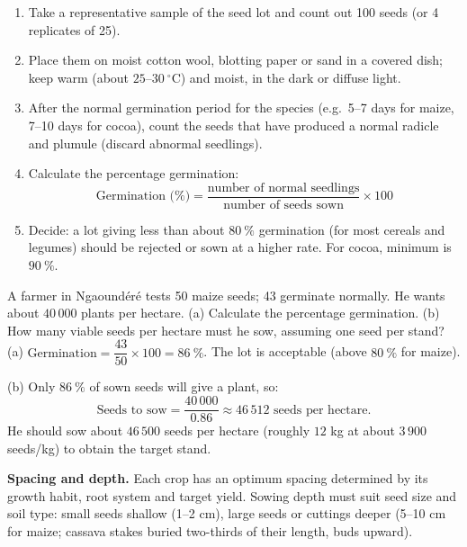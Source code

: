 \documentclass[11pt]{article}
\newcounter{popsec}
\newcounter{popsub}
\newcommand{\courssub}[1]{%
  \stepcounter{popsub}%
  \par\vspace{9pt}\noindent{\popxbold\fontsize{11.5}{13}\selectfont\color{popink}{\color{poporange}\thepopsec.\thepopsub}\hspace{6pt}#1}\par\nopagebreak\vspace{4pt}
}
\begin{document}
\begin{methode}
\begin{enumerate}
\item Take a representative sample of the seed lot and count out 100 seeds (or 4 replicates of 25).
\item Place them on moist cotton wool, blotting paper or sand in a covered dish; keep warm (about $25$--$30\ ^{\circ}\mathrm{C}$) and moist, in the dark or diffuse light.
\item After the normal germination period for the species (e.g.\ 5--7 days for maize, 7--10 days for cocoa), count the seeds that have produced a normal radicle and plumule (discard abnormal seedlings).
\item Calculate the percentage germination:
\[ \text{Germination (\%)} = \frac{\text{number of normal seedlings}}{\text{number of seeds sown}} \times 100 \]
\item Decide: a lot giving less than about $80\ \%$ germination (for most cereals and legumes) should be rejected or sown at a higher rate. For cocoa, minimum is $90\ \%$.
\end{enumerate}
\end{methode}

\begin{exoresolu}
A farmer in Ngaoundéré tests 50 maize seeds; 43 germinate normally. He wants about $40\,000$ plants per hectare. (a) Calculate the percentage germination. (b) How many viable seeds per hectare must he sow, assuming one seed per stand?
\tcblower
(a) $\text{Germination} = \dfrac{43}{50}\times 100 = 86\ \%$. The lot is acceptable (above $80\ \%$ for maize).

(b) Only $86\ \%$ of sown seeds will give a plant, so:
\[ \text{Seeds to sow} = \frac{40\,000}{0.86} \approx 46\,512 \text{ seeds per hectare.} \]
He should sow about $46\,500$ seeds per hectare (roughly $12$ kg at about $3\,900$ seeds/kg) to obtain the target stand.
\end{exoresolu}

\courssub{Planting Practices}

\textbf{Spacing and depth.} Each crop has an optimum spacing determined by its growth habit, root system and target yield. Sowing depth must suit seed size and soil type: small seeds shallow (1--2 cm), large seeds or cuttings deeper (5--10 cm for maize; cassava stakes buried two-thirds of their length, buds upward).
\end{document}
